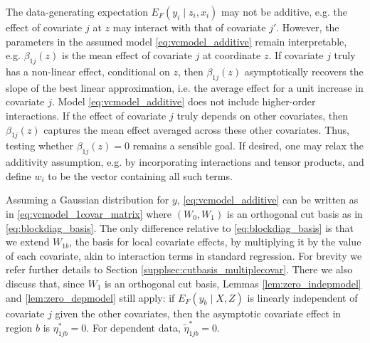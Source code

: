 The data-generating expectation $E_F(y_i \mid z_i,x_i)$ may not be additive, e.g. the effect of covariate $j$ at $z$ may interact with that of covariate $j'$. However, the parameters in the assumed model \eqref{eq:vcmodel_additive} remain interpretable, e.g. $\beta_{1j}(z)$ is the mean effect of covariate $j$ at coordinate $z$.
 If covariate $j$ truly has a non-linear effect, conditional on $z$, then $\beta_{1j}(z)$ asymptotically recovers the slope of the best linear approximation, i.e. the average effect for a unit increase in covariate $j$. 
 Model \eqref{eq:vcmodel_additive} does not include higher-order interactions. If the effect of covariate $j$ truly depends on other covariates, then $\beta_{1j}(z)$ captures the mean effect averaged across these other covariates.  Thus, testing whether $\beta_{1j}(z)=0$ remains a sensible goal.
If desired, one may relax the additivity assumption, e.g. by incorporating interactions and tensor products,  and define $w_i$ to be the vector containing all such terms. %



Assuming a Gaussian distribution for $y$, \eqref{eq:vcmodel_additive} can be written as
in \eqref{eq:vcmodel_1covar_matrix}
where $(W_0,W_1)$ is an orthogonal cut basis as in \eqref{eq:blockdiag_basis}. The only difference relative to \eqref{eq:blockdiag_basis} is that we extend $W_{1b}$, the basis for local covariate effects, by multiplying it by the value of each covariate, akin to interaction terms in standard regression. 
For brevity we refer further details to Section \ref{supplsec:cutbasis_multiplecovar}.
There we also discuss that, since $W_1$ is an orthogonal cut basis, Lemmas \ref{lem:zero_indepmodel} and \ref{lem:zero_depmodel}  still apply:
if $E_F(y_b \mid X,Z)$ is linearly independent of covariate $j$ given the other covariates, then the asymptotic covariate effect in region $b$ is $\eta_{1jb}^*=0$. For dependent data, $\tilde{\eta}_{1jb}^*=0$.


